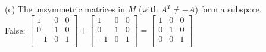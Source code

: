 \documentclass[10pt,twoside,reqno]{article}
\begin{document}
\begin{enumerate}
{\vspace{3mm}
(c) The unsymmetric matrices in $M$ (with $A^T \neq -A$) form a subspace.\\ \vspace{1mm}
\vspace{3mm}
False:
$
$$
\begin{bmatrix}
1&0&0\\
0&1&0\\
-1&0&1\\
\end{bmatrix}
+
\begin{bmatrix}
1&0&0\\
0&1&0\\
-1&0&1\\
\end{bmatrix}
=
\begin{bmatrix}
1&0&0\\
0&1&0\\
0&0&1\\
\end{bmatrix}
$$
$

}
\end{enumerate}
\end{document}
